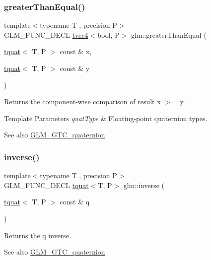 \subsubsection{\texorpdfstring{greater\+Than\+Equal()}{greaterThanEqual()}}
{\footnotesize\ttfamily template$<$typename T , precision P$>$ \\
G\+L\+M\+\_\+\+F\+U\+N\+C\+\_\+\+D\+E\+CL \hyperlink{structglm_1_1tvec4}{tvec4}$<$bool, P$>$ glm\+::greater\+Than\+Equal (\begin{DoxyParamCaption}\item[{\hyperlink{structglm_1_1tquat}{tquat}$<$ T, P $>$ const \&}]{x,  }\item[{\hyperlink{structglm_1_1tquat}{tquat}$<$ T, P $>$ const \&}]{y }\end{DoxyParamCaption})}

Returns the component-\/wise comparison of result x $>$= y.


\begin{DoxyTemplParams}{Template Parameters}
{\em quat\+Type} & Floating-\/point quaternion types.\\
\hline
\end{DoxyTemplParams}
\begin{DoxySeeAlso}{See also}
\hyperlink{group__gtc__quaternion}{G\+L\+M\+\_\+\+G\+T\+C\+\_\+quaternion} 
\end{DoxySeeAlso}
\mbox{\label{group__gtc__quaternion_ga5f47300c024c2d809944e6ac661d6d14}} 
\subsubsection{\texorpdfstring{inverse()}{inverse()}}
{\footnotesize\ttfamily template$<$typename T , precision P$>$ \\
G\+L\+M\+\_\+\+F\+U\+N\+C\+\_\+\+D\+E\+CL \hyperlink{structglm_1_1tquat}{tquat}$<$T, P$>$ glm\+::inverse (\begin{DoxyParamCaption}\item[{\hyperlink{structglm_1_1tquat}{tquat}$<$ T, P $>$ const \&}]{q }\end{DoxyParamCaption})}

Returns the q inverse.

\begin{DoxySeeAlso}{See also}
\hyperlink{group__gtc__quaternion}{G\+L\+M\+\_\+\+G\+T\+C\+\_\+quaternion} 
\end{DoxySeeAlso}
\mbox{\label{group__gtc__quaternion_ga0a850f06736d25887536d0da88e63c70}} 
